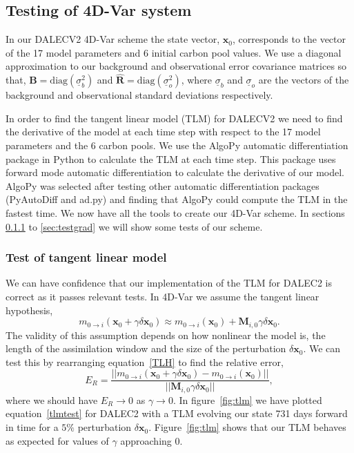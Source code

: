 \documentclass[11pt]{article}
\begin{document}

\subsection{Testing of 4D-Var system}

In our DALECV2 4D-Var scheme the state vector, $\textbf{x}_0$, corresponds to the vector of the 17 model parameters and 6 initial carbon pool values. We use a diagonal approximation to our background and observational error covariance matrices so that, 
$\textbf{B}=\text{diag}(\underline{\sigma}_b^2)$ and $\hat{\textbf{R}}=\text{diag}(\underline{\sigma}_o^2 )$,
where $\underline{\sigma}_b$ and $\underline{\sigma}_o$ are the vectors of the background and observational standard deviations respectively.

In order to find the tangent linear model (TLM) for DALECV2 we need to find the derivative of the model at each time step with respect to the 17 model parameters and the 6 carbon pools. We use the AlgoPy automatic differentiation package in Python to calculate the TLM at each time step. This package uses forward mode automatic differentiation to calculate the derivative of our model. AlgoPy was selected after testing other automatic differentiation packages (PyAutoDiff and ad.py) and finding that AlgoPy could compute the TLM in the fastest time. We now have all the tools to create our 4D-Var scheme. In sections \ref{sec:testtlm} to \ref{sec:testgrad} we will show some tests of our scheme.

\subsubsection{Test of tangent linear model} \label{sec:testtlm}

We can have confidence that our implementation of the TLM for DALEC2 is correct as it passes relevant tests. In 4D-Var we assume the tangent linear hypothesis,
\begin{equation}
m_{0\rightarrow i}(\mathbf{x}_0+\gamma \delta\mathbf{x}_0) \approx m_{0 \rightarrow i}(\mathbf{x}_0) + \mathbf{M}_{i,0}\gamma \delta\mathbf{x}_0. \label{TLH}
\end{equation}
The validity of this assumption depends on how nonlinear the model is, the length of the assimilation window and the size of the perturbation $\delta\mathbf{x}_0$. We can test this by rearranging equation~\ref{TLH} to find the relative error,
\begin{equation}
E_R=\frac{||m_{0\rightarrow i}(\mathbf{x}_0+\gamma \delta\mathbf{x}_0) - m_{0 \rightarrow i}(\mathbf{x}_0)||}{||\mathbf{M}_{i,0}\gamma\delta\mathbf{x}_0||}, \label{tlmtest}
\end{equation}
where we should have $E_R \rightarrow 0$ as $\gamma \rightarrow 0$. In figure~\ref{fig:tlm} we have plotted equation~\ref{tlmtest} for DALEC2 with a TLM evolving our state 731 days forward in time for a $5\%$ perturbation $\delta \textbf{x}_0$. Figure~\ref{fig:tlm} shows that our TLM behaves as expected for values of $\gamma$ approaching $0$.
\end{document}
